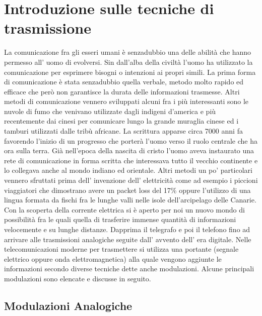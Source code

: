 \chapter{Introduzione sulle tecniche di trasmissione}
\label{cha:intro}

 La comunicazione fra gli esseri umani è senzadubbio una delle abilità che hanno permesso all' uomo di evolversi. Sin dall'alba della civiltà l'uomo ha utilizzato la comunicazione per esprimere bisogni o intenzioni ai propri simili. La prima forma di comunicazione è stata senzadubbio quella verbale, metodo molto rapido ed efficace che però non garantisce la durata delle informazioni trasmesse. Altri metodi di comunicazione vennero sviluppati alcuni fra i più interessanti sono le nuvole di fumo che venivano utilizzate dagli indigeni d'america e più recentemente dai cinesi per comunicare lungo la grande muraglia cinese ed i tamburi utilizzati dalle tribù africane. La scrittura apparse circa 7000 anni fa favorendo l'inizio di un progresso che porterà l'uomo verso il ruolo centrale che ha ora sulla terra. Già nell'epoca della nascita di cristo l'uomo aveva instaurato una rete di comunicazione in forma scritta che interessava tutto il vecchio continente e lo collegava anche al mondo indiano ed orientale. Altri metodi un po' particolari vennero sfruttati prima dell' invenzione dell' elettricità come ad esempio i piccioni viaggiatori che dimostrano avere un packet loss del 17\% oppure l'utilizzo di una lingua formata da fischi fra le lunghe valli nelle isole dell'arcipelago delle Canarie.
Con la scoperta della corrente elettrica si è aperto per noi un nuovo mondo di possibilità fra le quali quella di trasferire immense quantità di informazioni velocemente e su lunghe distanze. Dapprima il telegrafo e poi il telefono fino ad arrivare alle trasmissioni analogiche seguite dall' avvento dell' era digitale. Nelle telecomunicazioni moderne per trasmettere si utilizza una portante (segnale elettrico oppure onda elettromagnetica) alla quale vengono aggiunte le informazioni secondo diverse tecniche dette anche modulazioni. Alcune principali modulazioni sono elencate e discusse in seguito.


\section{Modulazioni Analogiche}
\label{sec:context}

